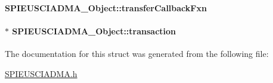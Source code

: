 \paragraph[{transfer\+Callback\+Fxn}]{ S\+P\+I\+E\+U\+S\+C\+I\+A\+D\+M\+A\+\_\+\+Object\+::transfer\+Callback\+Fxn}\label{struct_s_p_i_e_u_s_c_i_a_d_m_a___object_affae46790dac7c7f45301ec41404bfd0}
\paragraph[{transaction}]{$\ast$ S\+P\+I\+E\+U\+S\+C\+I\+A\+D\+M\+A\+\_\+\+Object\+::transaction}\label{struct_s_p_i_e_u_s_c_i_a_d_m_a___object_af400fd7340d7319ad5334ffa9a4f0f36}


The documentation for this struct was generated from the following file\+:\begin{DoxyCompactItemize}
\item 
\hyperlink{_s_p_i_e_u_s_c_i_a_d_m_a_8h}{S\+P\+I\+E\+U\+S\+C\+I\+A\+D\+M\+A.\+h}\end{DoxyCompactItemize}
